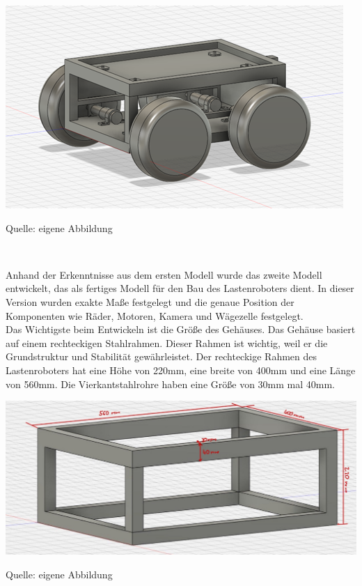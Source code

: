 \documentclass[ngerman,12pt,a4paper]{article}
\begin{document}
		\begin{center} 
			\begin{minipage}[t]{0.7\textwidth}
				\includegraphics{Pictures/modell-2}
				\label{fig:Modell-2}
				\vspace{-10pt}
				\begin{center}
					\par\small Quelle: eigene Abbildung 
				\end{center}
			\end{minipage} \\[0.75cm]
		\end{center}
		Anhand der Erkenntnisse aus dem ersten Modell wurde das zweite Modell entwickelt, das als fertiges Modell für den Bau des Lastenroboters dient. In dieser Version wurden exakte Maße festgelegt und die genaue Position der Komponenten wie Räder, Motoren, Kamera und Wägezelle festgelegt. \\[0.5cm]
		Das Wichtigste beim Entwickeln ist die Größe des Gehäuses. Das Gehäuse basiert auf einem rechteckigen Stahlrahmen. Dieser Rahmen ist wichtig, weil er die Grundstruktur und Stabilität gewährleistet. Der rechteckige Rahmen des Lastenroboters hat eine Höhe von 220mm, eine breite von 400mm und eine Länge von 560mm. Die Vierkantstahlrohre haben eine Größe von 30mm mal 40mm.
		\begin{center} 
			\begin{minipage}[t]{0.7\textwidth}
				\includegraphics[scale=0.7]{Pictures/Rahmen}
				\label{fig:Rahmen}
				\vspace{-10pt}
				\begin{center}
					\par\small Quelle: eigene Abbildung 
				\end{center}
			\end{minipage} \\[0.75cm]
		\end{center}
\end{document}
